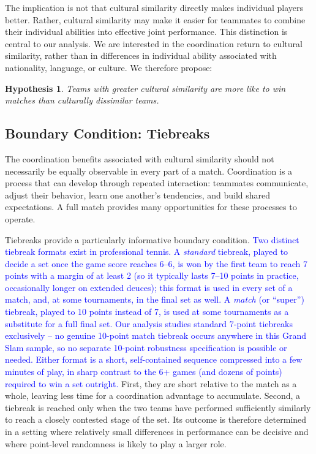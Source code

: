 \documentclass[10pt]{article}
\newtheorem{hypothesis}{Hypothesis}
\begin{document}
The implication is not that cultural similarity directly makes individual players better. Rather, cultural similarity may make it easier for teammates to combine their individual abilities into effective joint performance. This distinction is central to our analysis. We are interested in the coordination return to cultural similarity, rather than in differences in individual ability associated with nationality, language, or culture. We therefore propose:
\begin{hypothesis}
 Teams with greater cultural similarity are more like to win matches  than culturally dissimilar teams.
\end{hypothesis}
\subsection{Boundary Condition:  Tiebreaks}
The coordination benefits associated with cultural similarity should not necessarily be equally observable in every part of a match. Coordination is a process that can develop through repeated interaction: teammates communicate, adjust their behavior, learn one another's tendencies, and build shared expectations. A full match provides many opportunities for these processes to operate.

Tiebreaks provide a particularly informative boundary condition. \textcolor{blue}{Two distinct tiebreak formats exist in professional tennis. A \emph{standard} tiebreak, played to decide a set once the game score reaches 6--6, is won by the first team to reach 7 points with a margin of at least 2 (so it typically lasts 7--10 points in practice, occasionally longer on extended deuces); this format is used in every set of a match, and, at some tournaments, in the final set as well. A \emph{match} (or ``super'') tiebreak, played to 10 points instead of 7, is used at some tournaments as a substitute for a full final set. Our analysis studies standard 7-point tiebreaks exclusively -- no genuine 10-point match tiebreak occurs anywhere in this Grand Slam sample, so no separate 10-point robustness specification is possible or needed. Either format is a short, self-contained sequence compressed into a few minutes of play, in sharp contrast to the 6+ games (and dozens of points) required to win a set outright.} First, they are short relative to the match as a whole, leaving less time for a coordination advantage to accumulate. Second, a tiebreak is reached only when the two teams have performed sufficiently similarly to reach a closely contested stage of the set. Its outcome is therefore determined in a setting where relatively small differences in performance can be decisive and where point-level randomness is likely to play a larger role.
\end{document}
